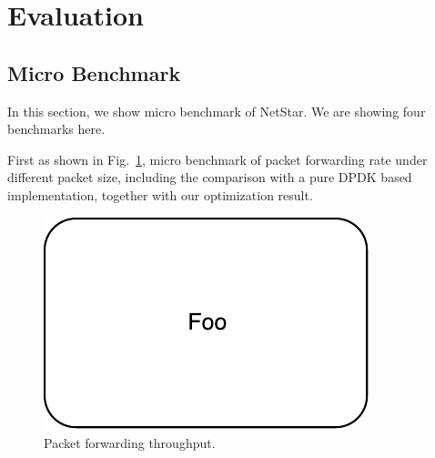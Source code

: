\section{Evaluation}
\label{sec:evaluation}




\subsection{Micro Benchmark}

In this section, we show micro benchmark of NetStar. We are showing four benchmarks here.

First as shown in Fig.~\ref{benchmark1}, micro benchmark of packet forwarding rate under different packet size, including the comparison with a pure DPDK based implementation, together with our optimization result.

\begin{figure}[!t]
  \centering
  \includegraphics[width=0.5\columnwidth]{figure/foo.pdf}
  \caption{Packet forwarding throughput.}
  \label{benchmark1}
\end{figure}

